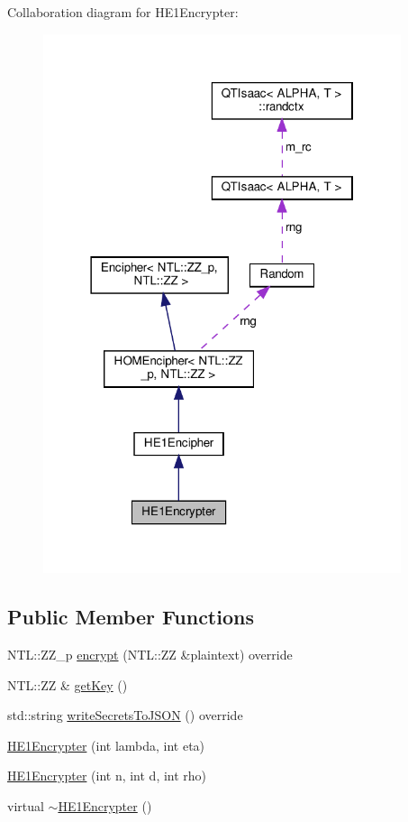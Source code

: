 Collaboration diagram for H\+E1\+Encrypter\+:\nopagebreak
\begin{figure}[H]
\begin{center}
\leavevmode
\includegraphics[width=298pt]{classHE1Encrypter__coll__graph}
\end{center}
\end{figure}
\subsection*{Public Member Functions}
\begin{DoxyCompactItemize}
\item 
N\+T\+L\+::\+Z\+Z\+\_\+p \hyperlink{classHE1Encrypter_afc178d8e27a1263bef824bfc8960dbc0}{encrypt} (N\+T\+L\+::\+ZZ \&plaintext) override
\item 
N\+T\+L\+::\+ZZ \& \hyperlink{classHE1Encrypter_a014c9eca9d9979fa45dad79b355a95cc}{get\+Key} ()
\item 
std\+::string \hyperlink{classHE1Encrypter_a05627c66faf89c133a24fa7bb4553ef2}{write\+Secrets\+To\+J\+S\+ON} () override
\item 
\hyperlink{classHE1Encrypter_a4126c0700e63763f7f239876a2196f54}{H\+E1\+Encrypter} (int lambda, int eta)
\item 
\hyperlink{classHE1Encrypter_a3cce07a63783a523afcf6905e2df4b93}{H\+E1\+Encrypter} (int n, int d, int rho)
\item 
virtual \hyperlink{classHE1Encrypter_ae9419b3ea61b96731501a9979f878131}{$\sim$\+H\+E1\+Encrypter} ()
\end{DoxyCompactItemize}
